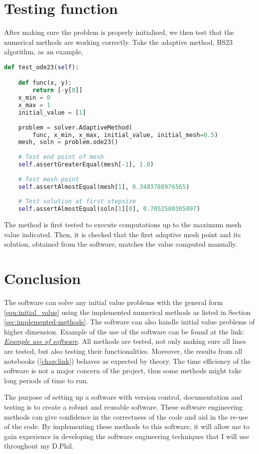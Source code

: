 \section{Testing function}
\label{sec:test_func}
After making sure the problem is properly initialised, we then test that the numerical methods are working correctly. Take the adaptive method, BS23 algorithm, as an example, 
\begin{lstlisting}[language=Python, caption= {testing of function}, title={Testing execution of method}, label={code:test_func}]
def test_ode23(self):

    def func(x, y):
        return [-y[0]]
    x_min = 0
    x_max = 1
    initial_value = [1]
    
    problem = solver.AdaptiveMethod(
        func, x_min, x_max, initial_value, initial_mesh=0.5)
    mesh, soln = problem.ode23()
    
    # Test end point of mesh
    self.assertGreaterEqual(mesh[-1], 1.0)
    
    # Test mesh point
    self.assertAlmostEqual(mesh[1], 0.3483788976565)
    
    # Test solution at first stepsize
    self.assertAlmostEqual(soln[1][0], 0.7052580305097)
\end{lstlisting}
The method is first tested to execute computations up to the maximum mesh value indicated. Then, it is checked that the first adaptive mesh point and its solution, obtained from the software, matches the value computed manually. 

\section{Conclusion}
\label{sec:software-conclusion}
The software can solve any initial value problems with the general form \ref{eqn:initial_value} using the implemented numerical methods as listed in Section \ref{sec:implemented-methods}. The software can also handle initial value problems of higher dimension. Example of the use of the software can be found at the link: \href{https://nbviewer.jupyter.org/github/FarmHJ/numerical-solver/blob/main/examples/fitzhugh_nagumo.ipynb}{\underline{\emph{Example use of software}}}. All methods are tested, not only making sure all lines are tested, but also testing their functionalities. Moreover, the results from all notebooks (\ref{chap:link}) behaves as expected by theory. The time efficiency of the software is not a major concern of the project, thus some methods might take long periods of time to run.

The purpose of setting up a software with version control, documentation and testing is to create a robust and reusable software. These software engineering methods can give confidence in the correctness of the code and aid in the re-use of the code. By implementing these methods to this software, it will allow me to gain experience in developing the software engineering techniques that I will use throughout my D.Phil.
